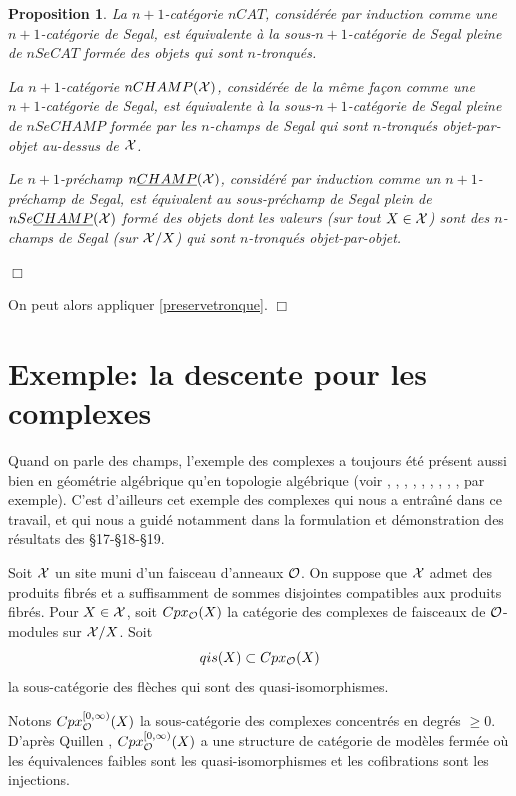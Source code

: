\documentclass[12pt]{article}
\newcommand{\numero}[1]{\newpage\section{#1}}
\newcommand{\eop}{\hfill $\Box$\vspace{.1in}}
\newtheorem{proposition}[lemma]{Proposition}
\newcommand{\Oo}{{\cal O}}
\newcommand{\Xx}{{\cal X}}
\begin{document}
\begin{proposition}
\label{segalounon}
La $n+1$-cat\'egorie $nCAT$, consid\'er\'ee
par induction comme une $n+1$-cat\'egorie de Segal, est \'equivalente
\`a la sous-$n+1$-cat\'egorie de Segal pleine de $nSeCAT$ form\'ee
des objets qui sont $n$-tronqu\'es.

La $n+1$-cat\'egorie $nCHAMP(\Xx )$,
consid\'er\'ee de la m\^eme fa\c{c}on comme une $n+1$-cat\'egorie de Segal,
est \'equivalente \`a la sous-$n+1$-cat\'egorie de Segal
pleine de
$nSeCHAMP$ form\'ee par les $n$-champs de Segal qui sont $n$-tronqu\'es
objet-par-objet au-dessus de $\Xx$.

Le $n+1$-pr\'echamp $n\underline{CHAMP}(\Xx )$,
consid\'er\'e par induction comme un $n+1$-pr\'echamp de Segal,
est \'equivalent au sous-pr\'echamp de Segal plein de
$nSe\underline{CHAMP}(\Xx )$
form\'e des objets dont les valeurs (sur tout $X\in \Xx$) sont
des $n$-champs de
Segal (sur $\Xx/X$) qui sont $n$-tronqu\'es objet-par-objet.
\end{proposition}
\eop

On peut alors appliquer \ref{preservetronque}.
\eop





\numero{Exemple: la descente pour les complexes}

\label{complexepage}

Quand on parle des champs, l'exemple des complexes a toujours \'et\'e pr\'esent
aussi bien en g\'eom\'etrie alg\'ebrique qu'en topologie alg\'ebrique
(voir \cite{SGA4b}, \cite{SGA6}, \cite{GabrielZisman}, \cite{Quillen}, \cite{ResiduesDuality},
\cite{Illusie}, \cite{ThomasonTrobaugh},
\cite{BondalKapranov}, \cite{Hinich2}, \cite{HoveyBook}  par exemple).
C'est d'ailleurs cet exemple des complexes qui nous a entra\^{\i}n\'e dans
ce travail, et qui nous a guid\'e notamment dans la formulation et
d\'emonstration des r\'esultats des \S 17-\S 18-\S 19.


Soit $\Xx$ un site muni d'un faisceau d'anneaux $\Oo$.
On suppose que $\Xx$ admet des produits fibr\'es et a suffisamment de sommes
disjointes compatibles aux produits fibr\'es. Pour $X\in \Xx$, soit
$Cpx_{\Oo}(X)$ la cat\'egorie des complexes de faisceaux de
$\Oo$-modules sur $\Xx /X$. Soit
$$
qis(X)\subset Cpx_{\Oo}(X)
$$
la sous-cat\'egorie des fl\`eches qui sont des quasi-isomorphismes.

Notons $Cpx_{\Oo}^{[0, \infty )}(X)$ la sous-cat\'egorie des complexes
concentr\'es en degr\'es
$\geq 0$. D'apr\`es
Quillen \cite{Quillen}, $Cpx_{\Oo}^{[0,
\infty )}(X)$ a une structure de cat\'egorie de mod\`eles ferm\'ee o\`u les
\'e\-qui\-va\-len\-ces faibles sont les quasi-isomorphismes et les cofibrations
sont les injections.
\end{document}
